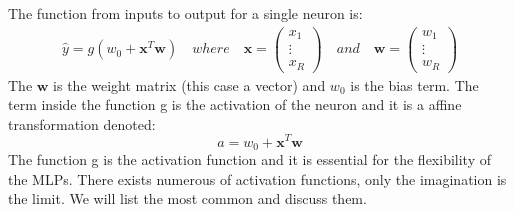 The function from inputs to output for a single neuron is:
\begin{align*}   
\hat{y}=g(w_0 + \bm{x}^T \bm{w}) \quad where \quad \bm{x}=\begin{pmatrix}
x_1 \\
\vdots\\
x_R
\end{pmatrix} \quad and \quad \bm{w}=\begin{pmatrix}
w_1 \\
\vdots \\
w_R
\end{pmatrix}
\end{align*}
The $\bm{w}$ is the weight matrix (this case a vector) and $w_0$ is the bias term. The term inside the function g is the activation of the neuron and it is a affine transformation denoted:
$$a= w_0 + \bm{x}^T \bm{w}$$
The function g is the activation function and it is essential for the flexibility of the MLPs. There exists numerous of activation functions, only the imagination is the limit. We will list the most common and discuss them.


